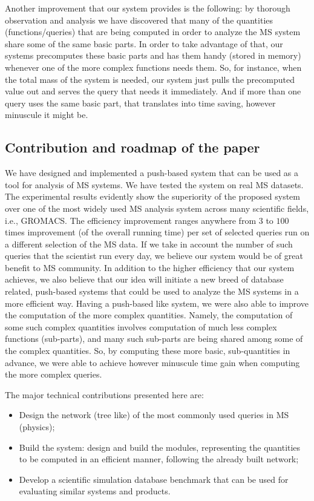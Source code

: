 \documentclass[10pt,journal,final,letterpaper,twocolumn]{IEEEtran}
\begin{document}
Another improvement that our system provides is the following: by
thorough observation and analysis we have discovered that many of
the quantities (functions/queries) that are being computed in order
to analyze the MS system share some of the same basic parts. In
order to take advantage of that, our systems precomputes these basic
parts and has them handy (stored in memory) whenever one of the more
complex functions needs them. So, for instance, when the total mass
of the system is needed, our system just pulls the precomputed value
out and serves the query that needs it immediately. And if more than
one query uses the same basic part, that translates into time
saving, however minuscule it might be.

\subsection{Contribution and roadmap of the paper} We have designed
and implemented a push-based system that can be used as a tool for
analysis of MS systems. We have tested the system on real MS
datasets. The experimental results evidently show the superiority of
the proposed system over one of the most widely used MS analysis
system across many scientific fields, i.e., GROMACS. The efficiency
improvement ranges anywhere from $3$ to $100$ times improvement (of
the overall running time) per set of selected queries run on a
different selection of the MS data. If we take in account the number
of such queries that the scientist run every day, we believe our
system would be of great benefit to MS community. In addition to the
higher efficiency that our system achieves, we also believe that our
idea will initiate a new breed of database related, push-based
systems that could be used to analyze the MS systems in a more
efficient way. Having a push-based like system, we were also able to
improve the computation of the more complex quantities. Namely, the
computation of some such complex quantities involves computation of
much less complex functions (sub-parts), and many such sub-parts are
being shared among some of the complex quantities. So, by computing
these more basic, sub-quantities in advance, we were able to achieve
however minuscule time gain when computing the more complex queries.

The major technical contributions presented here are:
\begin{itemize}
\item Design the network (tree like) of the most commonly used queries in MS (physics);
\item Build the system: design and build the modules, representing the quantities to be
computed in an efficient manner, following the already built
network;
\item Develop a scientific simulation database benchmark that can be used for evaluating similar systems and products.
\end{itemize}
\end{document}
